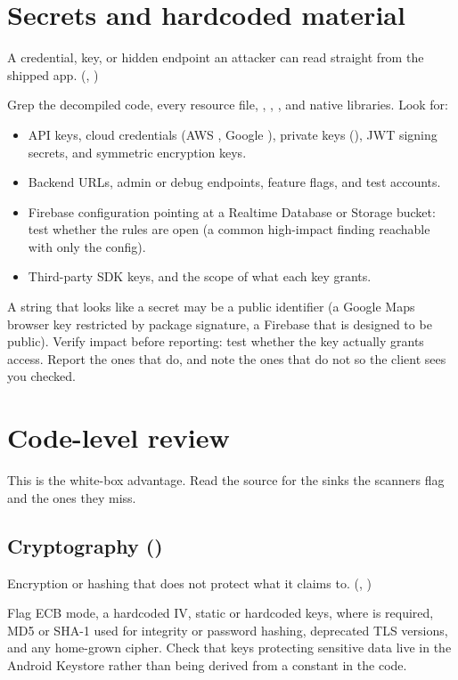 \section{Secrets and hardcoded material}
\begin{findingbox}
A credential, key, or hidden endpoint an attacker can read straight from the shipped app. (, )
\end{findingbox}

Grep the decompiled code, every resource file, , , , and native libraries. Look for:

\begin{itemize}
\item API keys, cloud credentials (AWS , Google ), private keys (), JWT signing secrets, and symmetric encryption keys.
\item Backend URLs, admin or debug endpoints, feature flags, and test accounts.
\item Firebase configuration pointing at a Realtime Database or Storage bucket: test whether the rules are open (a common high-impact finding reachable with only the config).
\item Third-party SDK keys, and the scope of what each key grants.
\end{itemize}

\begin{trap}
A string that looks like a secret may be a public identifier (a Google Maps browser key restricted by package signature, a Firebase  that is designed to be public). Verify impact before reporting: test whether the key actually grants access. Report the ones that do, and note the ones that do not so the client sees you checked.
\end{trap}

\section{Code-level review}
This is the white-box advantage. Read the source for the sinks the scanners flag and the ones they miss.

\subsection{Cryptography ()}
\begin{findingbox}
Encryption or hashing that does not protect what it claims to. (, )
\end{findingbox}
Flag ECB mode, a hardcoded IV, static or hardcoded keys,  where  is required, MD5 or SHA-1 used for integrity or password hashing, deprecated TLS versions, and any home-grown cipher. Check that keys protecting sensitive data live in the Android Keystore rather than being derived from a constant in the code.

